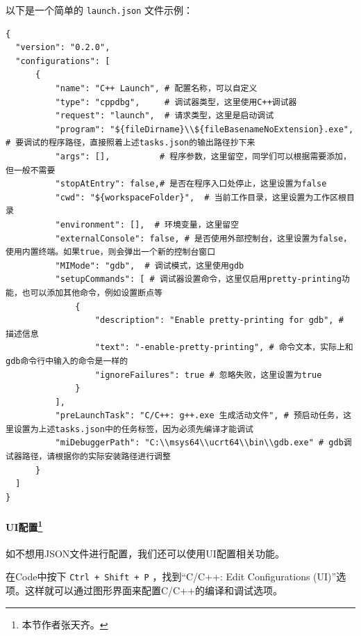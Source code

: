 以下是一个简单的 \texttt{launch.json} 文件示例：

\begin{verbatim}
{
  "version": "0.2.0",
  "configurations": [
      {
          "name": "C++ Launch", # 配置名称，可以自定义
          "type": "cppdbg",     # 调试器类型，这里使用C++调试器
          "request": "launch",  # 请求类型，这里是启动调试
          "program": "${fileDirname}\\${fileBasenameNoExtension}.exe", # 要调试的程序路径，直接照着上述tasks.json的输出路径抄下来
          "args": [],          # 程序参数，这里留空，同学们可以根据需要添加，但一般不需要
          "stopAtEntry": false,# 是否在程序入口处停止，这里设置为false
          "cwd": "${workspaceFolder}",  # 当前工作目录，这里设置为工作区根目录
          "environment": [],  # 环境变量，这里留空
          "externalConsole": false, # 是否使用外部控制台，这里设置为false，使用内置终端。如果true，则会弹出一个新的控制台窗口
          "MIMode": "gdb",  # 调试模式，这里使用gdb
          "setupCommands": [ # 调试器设置命令，这里仅启用pretty-printing功能，也可以添加其他命令，例如设置断点等
              {
                  "description": "Enable pretty-printing for gdb", # 描述信息
                  "text": "-enable-pretty-printing", # 命令文本，实际上和gdb命令行中输入的命令是一样的
                  "ignoreFailures": true # 忽略失败，这里设置为true
              }
          ],
          "preLaunchTask": "C/C++: g++.exe 生成活动文件", # 预启动任务，这里设置为上述tasks.json中的任务标签，因为必须先编译才能调试
          "miDebuggerPath": "C:\\msys64\\ucrt64\\bin\\gdb.exe" # gdb调试器路径，请根据你的实际安装路径进行调整
      }
  ]
}
\end{verbatim}

\paragraph[UI配置]{UI配置\protect\footnote{本节作者张天齐。}}

如不想用JSON文件进行配置，我们还可以使用UI配置相关功能。

在Code中按下 \texttt{Ctrl + Shift + P} ，找到“C/C++: Edit Configurations (UI)”选项。这样就可以通过图形界面来配置C/C++的编译和调试选项。

